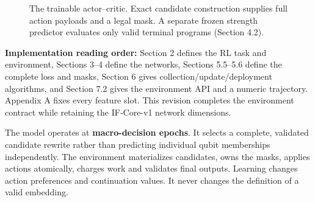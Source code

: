 \documentclass[10pt,a4paper]{article}
\begin{document}
\begin{figure}[htbp]
\centering
{}
\caption{The trainable actor--critic. Exact candidate construction supplies full action payloads and a legal mask. A separate frozen strength predictor evaluates only valid terminal programs (Section 4.2).}
\end{figure}

\textbf{Implementation reading order:} Section 2 defines the RL task and
environment, Sections 3--4 define the networks, Sections 5.5--5.6 define
the complete loss and masks, Section 6 gives
collection/update/deployment algorithms, and Section 7.2 gives the
environment API and a numeric trajectory. Appendix A fixes every feature
slot. This revision completes the environment contract while retaining
the IF-Core-v1 network dimensions.

The model operates at \textbf{macro-decision epochs}. It selects a
complete, validated candidate rewrite rather than predicting individual
qubit memberships independently. The environment materializes
candidates, owns the masks, applies actions atomically, charges work and
validates final outputs. Learning changes action preferences and
continuation values. It never changes the definition of a valid
embedding.
\end{document}
